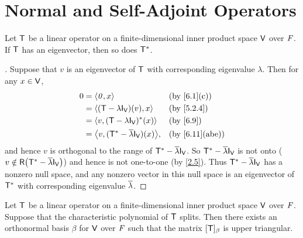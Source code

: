 \section{Normal and Self-Adjoint Operators}\label{sec:6.4}

\begin{lem}\label{6.4.1}
	Let \(\mathsf{T}\) be a linear operator on a finite-dimensional inner product space \(\mathsf{V}\) over \(\mathit{F}\).
	If \(\mathsf{T}\) has an eigenvector, then so does \(\mathsf{T}^*\).
\end{lem}

\begin{proof}[]
	Suppose that \(v\) is an eigenvector of \(\mathsf{T}\) with corresponding eigenvalue \(\lambda\).
	Then for any \(x \in \mathsf{V}\),
	\begin{align*}
		0 & = \inn{\zv, x}                                 &  & \by{6.1}[c]    \\
		  & = \inn{(\T - \lambda \IT[\V])(v), x}           &  & \by{5.2.4}     \\
		  & = \inn{v, (\T - \lambda \IT[\V])^*(x)}         &  & \by{6.9}       \\
		  & = \inn{v, (\T^* - \conj{\lambda} \IT[\V])(x)}, &  & \by{6.11}[abe]
	\end{align*}
	and hence \(v\) is orthogonal to the range of \(\T^* - \conj{\lambda} \IT[\V]\).
	So \(\T^* - \conj{\lambda} \IT[\V]\) is not onto (\(v \notin \rg{\T^* - \conj{\lambda} \IT[\V]}\)) and hence is not one-to-one (by \cref{2.5}).
	Thus \(\T^* - \conj{\lambda} \IT[\V]\) has a nonzero null space, and any nonzero vector in this null space is an eigenvector of \(\mathsf{T}^*\) with corresponding eigenvalue \(\overline{\lambda}\).
\end{proof}

\begin{thm}\label{6.14}
	Let \(\mathsf{T}\) be a linear operator on a finite-dimensional inner product space \(\mathsf{V}\) over \(\mathit{F}\).
	Suppose that the characteristic polynomial of \(\mathsf{T}\) splits.
	Then there exists an orthonormal basis \(\beta\) for \(\mathsf{V}\) over \(\mathit{F}\) such that the matrix \([\mathsf{T}]_{\beta}\) is upper triangular.
\end{thm}

